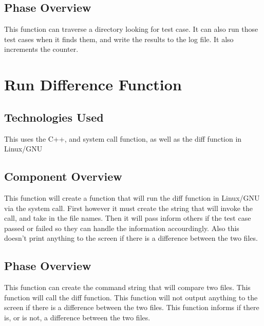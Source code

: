 \subsection{Phase Overview}
This function can traverse a directory looking for test case.  It can also run those 
test cases when it finds them, and write the results to the log file.  It also increments
the counter. 


\section{Run Difference Function}

\subsection{Technologies  Used}
This uses the C++, and system call function, as well as the diff function in Linux/GNU

\subsection{Component  Overview}
This function will create a function that will run the diff function in Linux/GNU via the system call.
First however it must create the string that will invoke the call, and take in the file names. Then it 
will pass inform others if the test case passed or failed so they can handle the information accourdingly. 
Also this doesn't print anything to the screen if there is a difference between the two files.

\subsection{Phase Overview}
This function can create the command string that will compare two files. This function will call the diff 
function. This function will not output anything to the screen if there is a difference between the two files. 
This function informs if there is, or is not, a difference between the two files.



